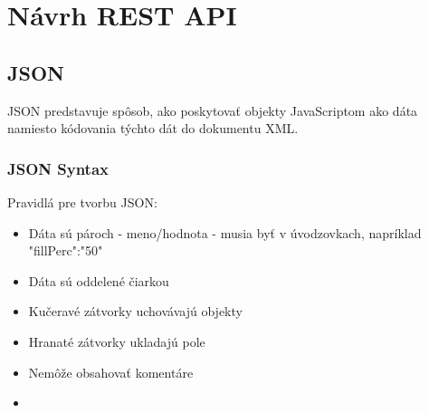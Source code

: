 \chapter{Návrh \acs{REST} \acs{API}}



\section{\acs{JSON}}


%
\ac{JSON} predstavuje spôsob, ako poskytovať objekty JavaScriptom ako dáta namiesto kódovania týchto dát do dokumentu XML. 

\cite[p.~280]{Suehring}



\subsection{JSON Syntax}

Pravidlá pre tvorbu JSON:

\begin{itemize}
	\item Dáta sú pároch - meno/hodnota - musia byť v úvodzovkach, napríklad "fillPerc":"50"
	\item Dáta sú oddelené čiarkou
	\item Kučeravé zátvorky uchovávajú objekty
	\item Hranaté zátvorky ukladajú pole
	\item Nemôže obsahovať komentáre
	\item 
\end{itemize}


